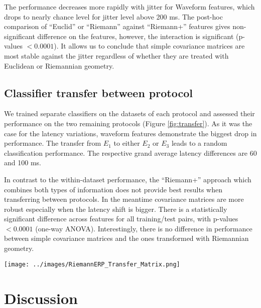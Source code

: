 \documentclass[12pt]{iopart}
\begin{document}
The performance decreases more
rapidly with jitter for Waveform features, which
drops to nearly chance level for jitter level above 200 ms.
The post-hoc comparison of ``Euclid'' or ``Riemann'' against ``Riemann+'' features gives non-significant
difference on the features, however, the interaction is significant (p-values $< 0.0001$).
It allows us to conclude that simple covariance matrices are most stable against the jitter
regardless of whether they are treated with Euclidean or Riemannian geometry.

\subsection{Classifier transfer between protocol}
We trained separate classifiers on the datasets of each protocol
and assessed their performance on the two remaining 
protocols (Figure \ref{fig:transfer}).
As it was the case for the latency variations, 
waveform features demonstrate the biggest drop
in performance. The transfer from $E_1$ to either $E_2$ or $E_3$
leads to a random classification performance. The respective grand average 
latency differences are 60 and 100 ms.

In contrast to the within-dataset performance, the ``Riemann+'' approach which
combines both types of information
does not provide best results when transferring between protocols.
In the meantime covariance matrices are more robust
especially when the latency shift is bigger.
There is a statistically significant difference across features
for all training/test pairs, with p-values $< 0.0001$ (one-way ANOVA).
Interestingly, there is no difference in performance between simple covariance matrices
and the ones transformed with Riemannian geometry.


\begin{figure*}[!t]
    \centerline{\texttt{[image: ../images/RiemannERP\_Transfer\_Matrix.png]}}
    \caption{Cross-protocol classifier transfer. First three matrices show AUC estimated
    on test dataset (y-axis) with a classifier trained on a training dataset (x-axis).
    The right-most matrix provides p-values in $\mathrm{log_{10}}(\cdot)$ obtained with ANOVA when comparing features
    for each train/test pair.}
\label{fig:transfer}
\end{figure*}

\section{Discussion}
\label{sec:discussion}
\end{document}
